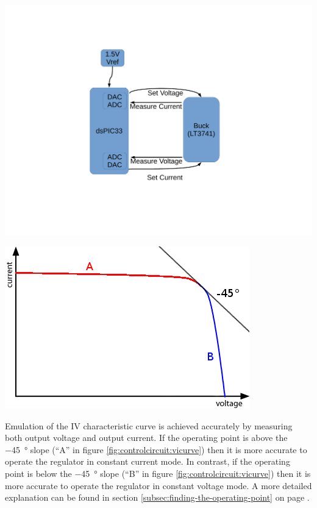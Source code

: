 \begin{minipage}{0.5\textwidth}
    \center
    \includegraphics[width=\textwidth,trim=140 140 120 100,clip]{images/block-diag-control.pdf}
    \label{fig:controlcircuit:schcematic}
\end{minipage}
\begin{minipage}{0.5\textwidth}
    \center
    \includegraphics[width=\textwidth]{images/vi-curve.png}
    \label{fig:controlcircuit:vicurve}
\end{minipage}

Emulation of the IV characteristic  curve  is  achieved  accurately by measuring
both output voltage and output current. If  the  operating  point  is  above the
\SI{-45}{\degree} slope (``A'' in  figure \ref{fig:controlcircuit:vicurve}) then
it is more accurate  to  operate  the  regulator  in  constant  current mode. In
contrast, if the operating point is below  the \SI{-45}{\degree} slope (``B'' in
figure \ref{fig:controlcircuit:vicurve}) then it is more accurate to operate the
regulator in constant voltage mode. A more detailed explanation can  be found in
section         \ref{subsec:finding-the-operating-point}         on         page
\pageref{subsec:finding-the-operating-point}.


